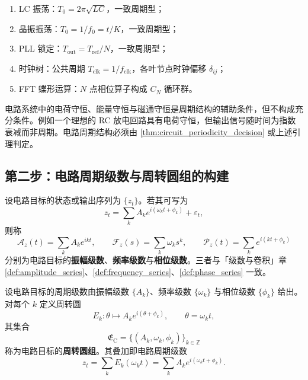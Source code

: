 \begin{example}[电路周期判定实例]\label{ex:circuit_periodic_examples}
\begin{enumerate}[label=(\roman*)]
    \item LC 振荡：$T_0=2\pi\sqrt{LC}$，一致周期型；
    \item 晶振振荡：$T_0=1/f_0=t/K$，一致周期型；
    \item PLL 锁定：$T_{\text{out}}=T_{\text{ref}}/N$，一致周期型；
    \item 时钟树：公共周期 $T_{\text{clk}}=1/f_{\text{clk}}$，各叶节点时钟偏移 $\delta_{ij}$；
    \item FFT 蝶形运算：$N$ 点相位算子构成 $C_N$ 循环群。
\end{enumerate}
\end{example}

\begin{remark}[守恒量不保证周期]\label{rem:circuit_invariant_not_period}
电路系统中的电荷守恒、能量守恒与磁通守恒是周期结构的辅助条件，但不构成充分条件。例如一个理想的 RC 放电回路具有电荷守恒，但输出信号随时间为指数衰减而非周期。电路周期结构必须由 \cref{thm:circuit_periodicity_decision} 或上述引理判定。
\end{remark}

\subsection{第二步：电路周期级数与周转圆组的构建}

\begin{definition}\label{def:circuit_series}
设电路目标的状态或输出序列为 $\{z_t\}$。若其可写为
\[
z_t=\sum_k A_k e^{i(\omega_k t+\phi_k)}+\varepsilon_t,
\]
则称
\[
\mathcal A_z(t)=\sum_k A_k e^{ikt},\qquad
\mathcal F_z(s)=\sum_k \omega_k s^k,\qquad
\mathcal P_z(t)=\sum_k e^{i(kt+\phi_k)}
\]
分别为电路目标的\textbf{振幅级数}、\textbf{频率级数}与\textbf{相位级数}。三者与「级数与卷积」章 \cref{def:amplitude_series}、\cref{def:frequency_series}、\cref{def:phase_series} 一致。
\end{definition}

\begin{definition}[电路周转圆组]\label{def:circuit_epicycle_group}
设电路目标的周期级数由振幅级数 $\{A_k\}$、频率级数 $\{\omega_k\}$ 与相位级数 $\{\phi_k\}$ 给出。对每个 $k$ 定义周转圆
\[
E_k:\theta\mapsto A_k e^{i(\theta+\phi_k)},\qquad \theta=\omega_k t,
\]
其集合
\[
\mathfrak E_{\mathrm{C}}=\{(A_k,\omega_k,\phi_k)\}_{k\in\mathbb Z}
\]
称为电路目标的\textbf{周转圆组}。其叠加即电路周期级数
\[
z_t=\sum_k E_k(\omega_k t)=\sum_k A_k e^{i(\omega_k t+\phi_k)}.
\]
\end{definition}

